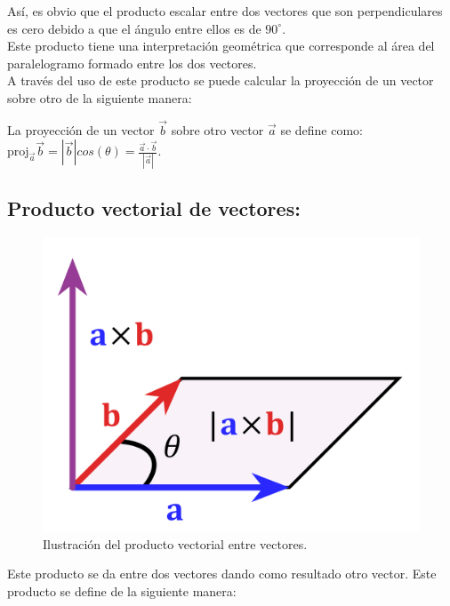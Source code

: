Así, es obvio que el producto escalar entre dos vectores que son perpendiculares es cero debido a que el ángulo entre 
ellos es de $90^\circ$.\\

Este producto tiene una interpretación geométrica que corresponde al área del paralelogramo formado entre los dos vectores.\\

A través del uso de este producto se puede calcular la proyección de un vector sobre otro de la siguiente manera:

\begin{tcolorbox}
La proyección de un vector $\vec{b}$ sobre otro vector $\vec{a}$ se define como: $\text{proj}_{\vec{a}}\vec{b} 
=|\vec{b}|cos(\theta)= \frac{\vec{a}\cdot\vec{b}}{|\vec{a}|}$.
\end{tcolorbox}

\subsection{Producto vectorial de vectores:}

\begin{figure}[ht]
 \centering
 \includegraphics[scale=0.1]{images/1200px-Cross_product_parallelogram.png}
 \caption{Ilustración del producto vectorial entre vectores.}
 \label{fig:vectorial}
\end{figure}

Este producto se da entre dos vectores dando como resultado otro vector. Este producto se define de la siguiente manera:

